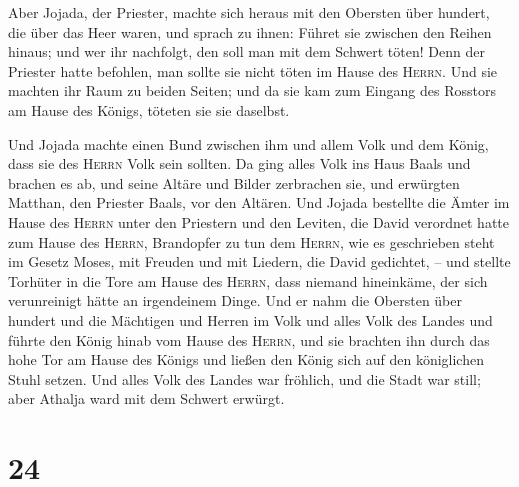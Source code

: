  Aber Jojada, der Priester, machte sich heraus mit den
Obersten über hundert, die über das Heer waren, und sprach zu ihnen:
Führet sie zwischen den Reihen hinaus; und wer ihr nachfolgt, den soll
man mit dem Schwert töten! Denn der Priester hatte befohlen, man sollte
sie nicht töten im Hause des \textsc{Herrn}.  Und sie
machten ihr Raum zu beiden Seiten; und da sie kam zum Eingang des
Rosstors am Hause des Königs, töteten sie sie daselbst.

 Und Jojada machte einen Bund zwischen ihm und allem Volk
und dem König, dass sie des \textsc{Herrn} Volk sein sollten.
 Da ging alles Volk ins Haus Baals und brachen es ab, und
seine Altäre und Bilder zerbrachen sie, und erwürgten Matthan, den
Priester Baals, vor den Altären.  Und Jojada bestellte
die Ämter im Hause des \textsc{Herrn} unter den Priestern und den
Leviten, die David verordnet hatte zum Hause des \textsc{Herrn},
Brandopfer zu tun dem \textsc{Herrn}, wie es geschrieben steht im Gesetz
Moses, mit Freuden und mit Liedern, die David gedichtet, --
 und stellte Torhüter in die Tore am Hause des
\textsc{Herrn}, dass niemand hineinkäme, der sich verunreinigt hätte an
irgendeinem Dinge.  Und er nahm die Obersten über hundert
und die Mächtigen und Herren im Volk und alles Volk des Landes und
führte den König hinab vom Hause des \textsc{Herrn}, und sie brachten
ihn durch das hohe Tor am Hause des Königs und ließen den König sich auf
den königlichen Stuhl setzen.  Und alles Volk des Landes
war fröhlich, und die Stadt war still; aber Athalja ward mit dem Schwert
erwürgt.

\hypertarget{section-23}{%
\section{24}\label{section-23}}

